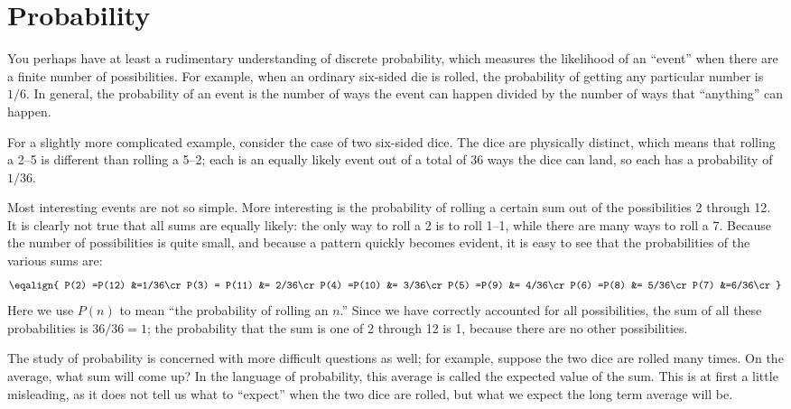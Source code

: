 \section{Probability}{}{}
\nobreak
You perhaps have at least a rudimentary understanding of
{\dfont discrete probability}, which
measures the likelihood of an ``event'' when there are a finite number
of possibilities. For example, when an ordinary six-sided die is
rolled, the probability of getting any particular number is $1/6$. In
general, the probability of an event is the number of ways the event
can happen divided by the number of ways that ``anything'' can happen.

For a slightly more complicated example, consider the case of two
six-sided dice. The dice are physically distinct, which means that
rolling a 2--5 is different than rolling a 5--2; each is an equally
likely event out of a total of 36 ways the dice can land, so each has
a probability of $1/36$.

Most interesting events are not so simple. More interesting is the
probability of rolling a certain sum out of the possibilities 2
through 12. It is clearly not true that all sums are equally likely:
the only way to roll a 2 is to roll 1--1, while there are many ways to
roll a 7. Because the number of possibilities is quite small, and
because a pattern quickly becomes evident, it is easy to see that the
probabilities of the various sums are:
$$\eqalign{
  P(2) =P(12)  &=1/36\cr  
  P(3) = P(11) &= 2/36\cr
  P(4) =P(10)  &= 3/36\cr
  P(5) =P(9)   &= 4/36\cr
  P(6) =P(8)   &= 5/36\cr
  P(7)         &=6/36\cr
}$$
Here we use $P(n)$ to mean ``the probability of rolling an $n$.''
Since we have correctly accounted for all possibilities, the sum of
all these probabilities is $36/36=1$; the probability that the sum is
one of 2 through 12 is 1, because there are no other possibilities.

The study of probability is concerned with more difficult questions as
well; for example, suppose the two dice are rolled many times. On the
average, what sum will come up? In the language of probability, this
average is called the {\dfont expected value\/}
of the sum. This is at first a little misleading, as it does not tell
us what to ``expect'' when the two dice are rolled, but what we expect
the long term average will be.


